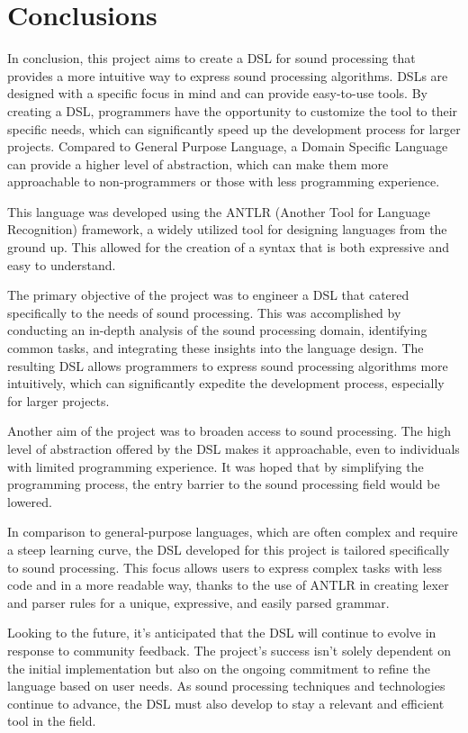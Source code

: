 \chapter*{Conclusions}
In conclusion, this project aims to create a DSL for sound processing that provides a more intuitive way to express sound processing algorithms. DSLs are designed with a specific focus in mind and can provide easy-to-use tools. By creating a DSL, programmers have the opportunity to customize the tool to their specific needs, which can significantly speed up the development process for larger projects. Compared to General Purpose Language, a Domain Specific Language can provide a higher level of abstraction, which can make them more approachable to non-programmers or those with less programming experience.

This language was developed using the ANTLR (Another Tool for Language Recognition) framework, a widely utilized tool for designing languages from the ground up. This allowed for the creation of a syntax that is both expressive and easy to understand.

The primary objective of the project was to engineer a DSL that catered specifically to the needs of sound processing. This was accomplished by conducting an in-depth analysis of the sound processing domain, identifying common tasks, and integrating these insights into the language design. The resulting DSL allows programmers to express sound processing algorithms more intuitively, which can significantly expedite the development process, especially for larger projects.

Another aim of the project was to broaden access to sound processing. The high level of abstraction offered by the DSL makes it approachable, even to individuals with limited programming experience. It was hoped that by simplifying the programming process, the entry barrier to the sound processing field would be lowered.

In comparison to general-purpose languages, which are often complex and require a steep learning curve, the DSL developed for this project is tailored specifically to sound processing. This focus allows users to express complex tasks with less code and in a more readable way, thanks to the use of ANTLR in creating lexer and parser rules for a unique, expressive, and easily parsed grammar.

Looking to the future, it's anticipated that the DSL will continue to evolve in response to community feedback. The project's success isn't solely dependent on the initial implementation but also on the ongoing commitment to refine the language based on user needs. As sound processing techniques and technologies continue to advance, the DSL must also develop to stay a relevant and efficient tool in the field.